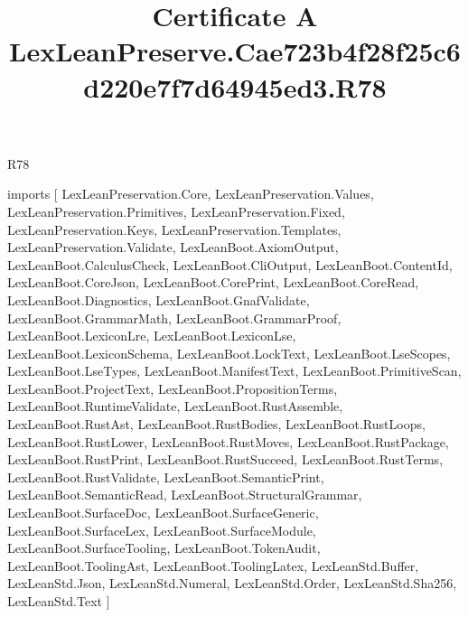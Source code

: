\begin{lexlean}{R78}
\title{Certificate A LexLeanPreserve.Cae723b4f28f25c6d220e7f7d64945ed3.R78}
\begin{coremodule}
imports [
  LexLeanPreservation.Core,
  LexLeanPreservation.Values,
  LexLeanPreservation.Primitives,
  LexLeanPreservation.Fixed,
  LexLeanPreservation.Keys,
  LexLeanPreservation.Templates,
  LexLeanPreservation.Validate,
  LexLeanBoot.AxiomOutput,
  LexLeanBoot.CalculusCheck,
  LexLeanBoot.CliOutput,
  LexLeanBoot.ContentId,
  LexLeanBoot.CoreJson,
  LexLeanBoot.CorePrint,
  LexLeanBoot.CoreRead,
  LexLeanBoot.Diagnostics,
  LexLeanBoot.GnafValidate,
  LexLeanBoot.GrammarMath,
  LexLeanBoot.GrammarProof,
  LexLeanBoot.LexiconLre,
  LexLeanBoot.LexiconLse,
  LexLeanBoot.LexiconSchema,
  LexLeanBoot.LockText,
  LexLeanBoot.LseScopes,
  LexLeanBoot.LseTypes,
  LexLeanBoot.ManifestText,
  LexLeanBoot.PrimitiveScan,
  LexLeanBoot.ProjectText,
  LexLeanBoot.PropositionTerms,
  LexLeanBoot.RuntimeValidate,
  LexLeanBoot.RustAssemble,
  LexLeanBoot.RustAst,
  LexLeanBoot.RustBodies,
  LexLeanBoot.RustLoops,
  LexLeanBoot.RustLower,
  LexLeanBoot.RustMoves,
  LexLeanBoot.RustPackage,
  LexLeanBoot.RustPrint,
  LexLeanBoot.RustSucceed,
  LexLeanBoot.RustTerms,
  LexLeanBoot.RustValidate,
  LexLeanBoot.SemanticPrint,
  LexLeanBoot.SemanticRead,
  LexLeanBoot.StructuralGrammar,
  LexLeanBoot.SurfaceDoc,
  LexLeanBoot.SurfaceGeneric,
  LexLeanBoot.SurfaceLex,
  LexLeanBoot.SurfaceModule,
  LexLeanBoot.SurfaceTooling,
  LexLeanBoot.TokenAudit,
  LexLeanBoot.ToolingAst,
  LexLeanBoot.ToolingLatex,
  LexLeanStd.Buffer,
  LexLeanStd.Json,
  LexLeanStd.Numeral,
  LexLeanStd.Order,
  LexLeanStd.Sha256,
  LexLeanStd.Text
]


\end{coremodule}
\end{lexlean}

